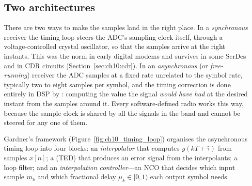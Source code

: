 

\subsection{Two architectures}

There are two ways to make the samples land in the right place. In a \emph{synchronous} receiver the
timing loop steers the ADC's sampling clock itself, through a voltage-controlled crystal oscillator,
so that the samples arrive at the right instants. This was the norm in early digital modems and
survives in some SerDes and in CDR circuits (Section~\ref{sec:ch10:cdr}). In an
\emph{asynchronous} (or \emph{free-running}) receiver the ADC samples at a fixed rate unrelated to the
symbol rate, typically two to eight samples per symbol, and the timing correction is done entirely in
DSP by : computing the value the signal \emph{would have had} at the desired
instant from the samples around it. Every software-defined radio works this way, because the sample
clock is shared by all the signals in the band and cannot be steered for any one of them.

Gardner's framework (Figure~\ref{fig:ch10_timing_loop}) organises the asynchronous timing loop into
four blocks: an \emph{interpolator} that computes $y(kT+\hat\tau)$ from samples $x[n]$; a
 (TED) that produces an error signal from the interpolants; a loop filter;
and an \emph{interpolation controller}---an NCO that decides which input sample $m_k$ and which
fractional delay $\mu_k\in[0,1)$ each output symbol needs.

